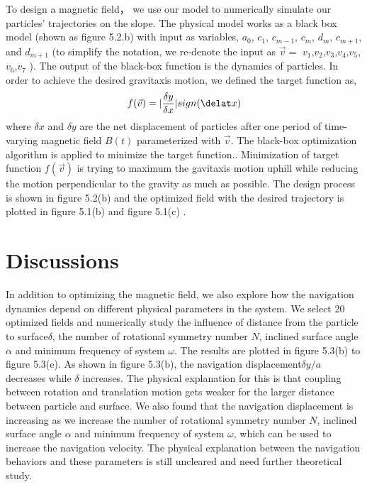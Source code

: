 To design a magnetic field， we use our model to numerically simulate our particles' trajectories on the slope. The physical model works as a black box model (shown as figure 5.2.b) with input as variables, $a_0$, $c_1$, $c_{m-1}$, $c_{m}$, $d_{m}$, $c_{m+1}$, and $d_{m+1}$ (to simplify the notation, we re-denote the input as $\vec{v}=$ $v_1$,$v_2$,$v_3$,$v_4$,$v_5$,$v_6$,$v_7$  ). The output of the black-box function is the dynamics of particles. In order to achieve the desired gravitaxis motion, we defined the target function as,
\begin{equation}
    f(\vec{v})=|\frac{\delta y}{\delta x}| sign(\delat x)
\end{equation}
where $\delta x$ and $\delta y$ are the net displacement of particles after one period of  time-varying magnetic field $B(t)$ parameterized with $\vec{v}$.
The black-box optimization algorithm is applied to minimize the target function.\autocite{dou2019autonomous}. Minimization of target function $f(\vec{v})$ is trying to maximum the gavitaxis motion uphill while reducing the motion perpendicular to the gravity as much as possible. The design process is shown in figure 5.2(b) and the optimized field with the desired trajectory is plotted in figure 5.1(b) and figure 5.1(c) .


 
\section{Discussions}
In addition to optimizing the magnetic field, we also explore how the navigation dynamics depend on different physical parameters in the system. We select 20 optimized fields and numerically study the influence of distance from the particle to surface$\delta$, the number of  rotational symmetry number $N$, inclined surface angle $\alpha$ and  minimum frequency of system  $\omega$. The results are plotted in figure 5.3(b) to figure 5.3(e). As shown in figure 5.3(b), the navigation displacement$\delta y/a$ decreases while $\delta$ increases. The physical explanation for this is that coupling between rotation and translation motion gets weaker for the larger distance between particle and surface. We also found that the navigation displacement is increasing as we increase the   number of  rotational symmetry number $N$, inclined surface angle $\alpha$ and  minimum frequency of system  $\omega$, which can be used to increase the navigation velocity. The physical explanation between the navigation behaviors and these parameters is still uncleared and need further theoretical study. 



